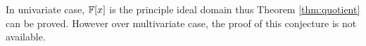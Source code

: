 In univariate case, ${\mathbb{F}}[x]$ is the principle ideal domain thus Theorem \ref{thm:quotient} can be proved.
However over multivariate case, the proof of this conjecture is not available.
% 
% 
% 
% 
% 
